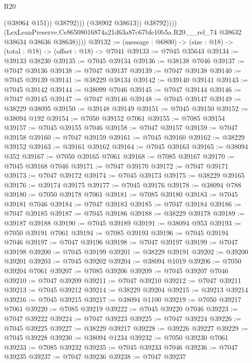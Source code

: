 \begin{lexlean}{R20}
\begin{coremodule}
{                            (@38964 @151))
                          @38792)))
                    (@38902 @38613))
                  @38792))))
          (LexLeanPreserve.Ce86508016874a21d63a87c67bfe10b5a.R20.__rel_74
            @38632
            @38634
            @38636
            @38638))))
@39132 := (message : @6800) -> (size : @18) -> (total : @18) -> (offset : @18) -> @7041
@39133 := @7045 @35643
@39134 := @39133 @38230
@39135 := @7045 @39134
@39136 := @38138 @7046
@39137 := @7047 @39136
@39138 := @7047 @39137
@39139 := @7047 @39138
@39140 := @7045 @39139
@39141 := @38229 @38134
@39142 := @39140 @39141
@39143 := @7045 @39142
@39144 := @38099 @7046
@39145 := @7047 @39144
@39146 := @7047 @39145
@39147 := @7047 @39146
@39148 := @7045 @39147
@39149 := @38229 @38095
@39150 := @39148 @39149
@39151 := @7045 @39150
@39152 := @38094 @192
@39154 := @7050 @39152 @7061
@39155 := @7085 @39154
@39157 := @7045 @39155 @7046
@39158 := @7047 @39157
@39159 := @7047 @39158
@39160 := @7047 @39159
@39161 := @7045 @39160
@39162 := @38229 @39152
@39163 := @39161 @39162
@39164 := @7045 @39163
@39165 := @38094 @352
@39167 := @7050 @39165 @7061
@39168 := @7085 @39167
@39170 := @7045 @39168 @7046
@39171 := @7047 @39170
@39172 := @7047 @39171
@39173 := @7047 @39172
@39174 := @7045 @39173
@39175 := @38229 @39165
@39176 := @39174 @39175
@39177 := @7045 @39176
@39178 := @38094 @788
@39180 := @7050 @39178 @7061
@39181 := @7085 @39180
@39183 := @7045 @39181 @7046
@39184 := @7047 @39183
@39185 := @7047 @39184
@39186 := @7047 @39185
@39187 := @7045 @39186
@39188 := @38229 @39178
@39189 := @39187 @39188
@39190 := @7045 @39189
@39191 := @38094 @953
@39193 := @7050 @39191 @7061
@39194 := @7085 @39193
@39196 := @7045 @39194 @7046
@39197 := @7047 @39196
@39198 := @7047 @39197
@39199 := @7047 @39198
@39200 := @7045 @39199
@39201 := @38229 @39191
@39202 := @39200 @39201
@39203 := @7045 @39202
@39204 := @38094 @1019
@39206 := @7050 @39204 @7061
@39207 := @7085 @39206
@39209 := @7045 @39207 @7046
@39210 := @7047 @39209
@39211 := @7047 @39210
@39212 := @7047 @39211
@39213 := @7045 @39212
@39214 := @38229 @39204
@39215 := @39213 @39214
@39216 := @7045 @39215
@39217 := @38094 @1100
@39219 := @7050 @39217 @7061
@39220 := @7085 @39219
@39222 := @7045 @39220 @7046
@39223 := @7047 @39222
@39224 := @7047 @39223
@39225 := @7047 @39224
@39226 := @7045 @39225
@39227 := @38229 @39217
@39228 := @39226 @39227
@39229 := @7045 @39228
@39230 := @38094 @1234
@39232 := @7050 @39230 @7061
@39233 := @7085 @39232
@39235 := @7045 @39233 @7046
@39236 := @7047 @39235
@39237 := @7047 @39236
@39238 := @7047 @39237
}
\end{coremodule}
\end{lexlean}
